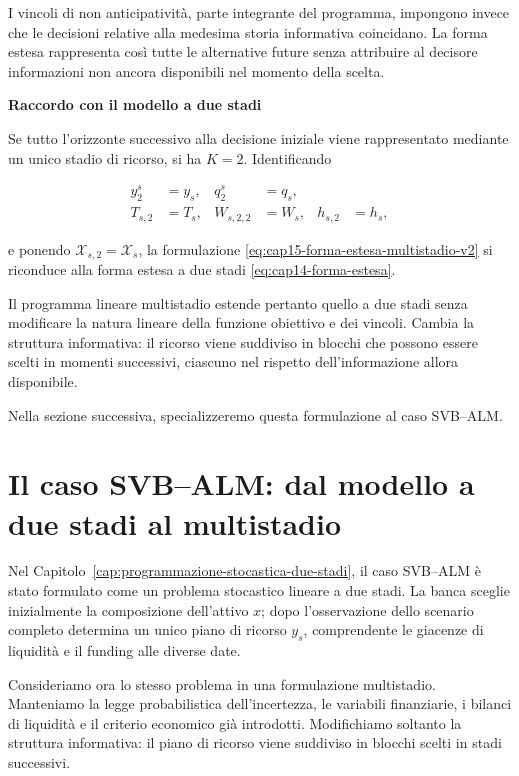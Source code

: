 I vincoli di non anticipativit\`a,
parte integrante del programma,
impongono invece che le decisioni
relative alla medesima storia
informativa coincidano.
La forma estesa rappresenta
cos\`i tutte le alternative
future senza attribuire
al decisore informazioni
non ancora disponibili
nel momento della scelta.

\medskip

\noindent
\textbf{Raccordo con il modello a due stadi}

Se tutto l'orizzonte successivo
alla decisione iniziale viene
rappresentato mediante un unico
stadio di ricorso, si ha $K=2$.
Identificando

\[
\begin{aligned}
y_2^s&=y_s,
&
q_2^s&=q_s,
\\[4pt]
T_{s,2}&=T_s,
&
W_{s,2,2}&=W_s,
&
h_{s,2}&=h_s,
\end{aligned}
\]

\noindent e ponendo
$\mathcal X_{s,2}=\mathcal X_s$,
la formulazione
\eqref{eq:cap15-forma-estesa-multistadio-v2}
si riconduce alla forma estesa
a due stadi
\eqref{eq:cap14-forma-estesa}.

Il programma lineare multistadio
estende pertanto quello a due stadi
senza modificare la natura lineare
della funzione obiettivo e dei vincoli.
Cambia la struttura informativa:
il ricorso viene suddiviso in
blocchi che possono essere scelti
in momenti successivi, ciascuno
nel rispetto dell'informazione
allora disponibile.

Nella sezione successiva,
specializzeremo questa
formulazione al caso SVB--ALM.

\section{Il caso SVB--ALM: dal modello a due stadi al multistadio}

\label{sec:cap15-svb-alm-multistadio-v2}

Nel Capitolo~\ref{cap:programmazione-stocastica-due-stadi},
il caso SVB--ALM \`e stato formulato come un problema
stocastico lineare a due stadi. La banca sceglie
inizialmente la composizione dell'attivo $x$; dopo
l'osservazione dello scenario completo determina
un unico piano di ricorso $y_s$, comprendente
le giacenze di liquidit\`a e il funding
alle diverse date.

Consideriamo ora lo stesso problema in una
formulazione multistadio. Manteniamo la legge
probabilistica dell'incertezza, le variabili
finanziarie, i bilanci di liquidit\`a e il
criterio economico gi\`a introdotti.
Modifichiamo soltanto la struttura informativa:
il piano di ricorso viene suddiviso in blocchi
scelti in stadi successivi.

